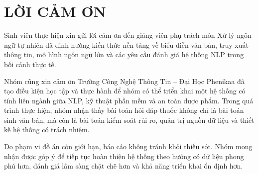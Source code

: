 \chapter*{LỜI CẢM ƠN}

Sinh viên thực hiện xin gửi lời cảm ơn đến giảng viên phụ trách môn Xử lý ngôn ngữ tự nhiên đã định hướng kiến thức nền tảng về biểu diễn văn bản, truy xuất thông tin, mô hình ngôn ngữ lớn và các yêu cầu đánh giá hệ thống NLP trong bối cảnh thực tế.

Nhóm cũng xin cảm ơn Trường Công Nghệ Thông Tin -- Đại Học Phenikaa đã tạo điều kiện học tập và thực hành để nhóm có thể triển khai một hệ thống có tính liên ngành giữa NLP, kỹ thuật phần mềm và an toàn dược phẩm. Trong quá trình thực hiện, nhóm nhận thấy bài toán hỏi đáp thuốc không chỉ là bài toán sinh văn bản, mà còn là bài toán kiểm soát rủi ro, quản trị nguồn dữ liệu và thiết kế hệ thống có trách nhiệm.

Do phạm vi đồ án còn giới hạn, báo cáo không tránh khỏi thiếu sót. Nhóm mong nhận được góp ý để tiếp tục hoàn thiện hệ thống theo hướng có dữ liệu phong phú hơn, đánh giá lâm sàng chặt chẽ hơn và khả năng triển khai ổn định hơn.

